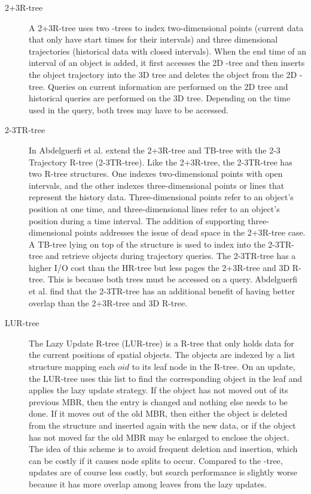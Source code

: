 \begin{description}
	\item[2+3R-tree] A 2+3R-tree\cite{nascimento1999evaluation} uses two 
	\rbase-trees to index two-dimensional points (current data that only have
	start times for their intervals) and three dimensional trajectories 
	(historical data with closed intervals). When the end time of an 
	interval of an object is added, it first accesses the 2D \rbase-tree
	and then inserts the object trajectory into the 3D tree and deletes the 
	object from the 2D \rbase-tree. Queries on current information are 
	performed on the 2D tree and historical queries are performed on the 3D
	tree. Depending on the time used in the query, both trees may have to be 
	accessed.
	\item[2-3TR-tree] In \cite{abdelguerfi20022} Abdelguerfi et al. extend 
	the 2+3R-tree and TB-tree with the 2-3 Trajectory R-tree (2-3TR-tree). 
	Like the 2+3R-tree, the 2-3TR-tree has two R-tree structures. One indexes
	two-dimensional points with open intervals, and the other indexes 
	three-dimensional points or lines that represent the history data. 
	Three-dimensional points refer to an object's position at one time, and 
	three-dimensional lines refer to an object's position during a time 
	interval. The addition of supporting three-dimensional points addresses 
	the issue of dead space in the 2+3R-tree case. A TB-tree lying on top of 
	the structure is used to index into the 2-3TR-tree and retrieve objects 
	during trajectory queries. The 2-3TR-tree has a higher I/O cost than the 
	HR-tree but less pages the 2+3R-tree and 3D R-tree. This is because both
	trees must be accessed on a query. Abdelguerfi et al. find that the 
	2-3TR-tree has an additional benefit of having better overlap than the 
	2+3R-tree and 3D R-tree.
	\item[LUR-tree] The Lazy Update R-tree (LUR-tree) \cite{kwon2002indexing}
	is a R-tree that only holds data for the current positions of spatial 
	objects. The objects are indexed by a list structure mapping each $oid$ 
	to its leaf node in the R-tree. On an update, the LUR-tree uses this list
	to find the corresponding object in the leaf and applies the lazy 
	update strategy. If the
	object has not moved out of its previous MBR, then the entry is changed
	and nothing else needs to be done. If it moves out of the old MBR, then 
	either the object is deleted from the structure and inserted again with 
	the new data, or if the object has not moved far the old MBR may be 
	enlarged to enclose the object. The idea of this scheme is to avoid 
	frequent deletion and insertion, which can be costly if it causes node
	splits to occur. Compared to the \rstar-tree, updates are of course less
	costly, but search performance is slightly worse because it has more 
	overlap among leaves from the lazy updates.
\end{description}

